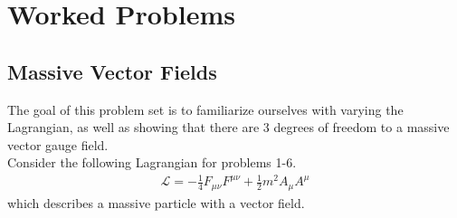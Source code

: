 \documentclass{book}
\numberwithin{equation}{section}
\theoremstyle{definition}
\newcommand{\lag}{\mathcal{L}}
\begin{document}
\chapter{Worked Problems}

\section{Massive Vector Fields}
The goal of this problem set is to familiarize ourselves with varying the Lagrangian, as well as showing that there are 3 degrees of freedom to a massive vector gauge field. \\

Consider the following Lagrangian for problems 1-6. 
\begin{align}
\lag = -\frac{1}{4}F_{\mu\nu}F^{\mu\nu} + \frac{1}{2}m^2 A_\mu A^\mu
\end{align}
which describes a massive particle with a vector field.\\
\end{document}
